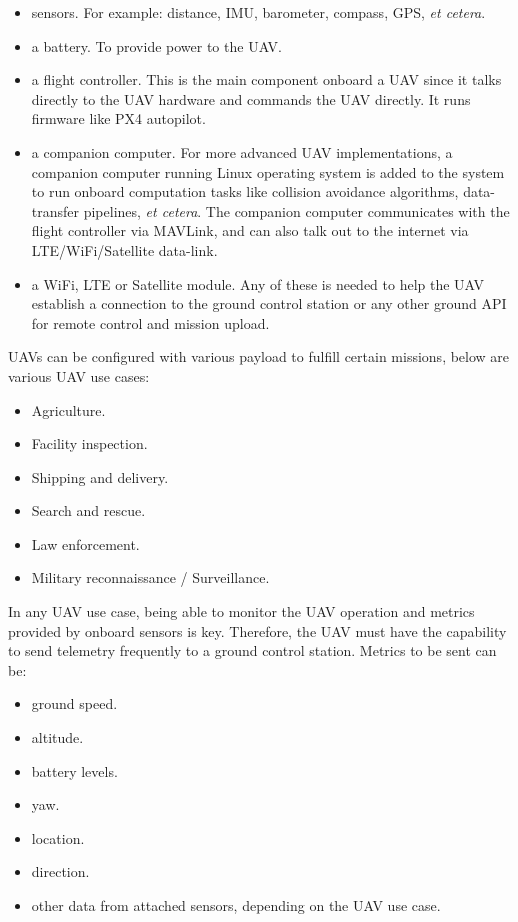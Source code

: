 \begin{itemize}
    \item sensors.  For example: distance, IMU, barometer, compass, GPS, \textit{et cetera}.
    \item a battery. To provide power to the UAV.
    \item a flight controller. This is the main component onboard a UAV since it talks directly to the UAV hardware and commands the UAV directly. It runs firmware like PX4 autopilot\cite{px4documentation}.
    \item a companion computer. For more advanced UAV implementations, a companion computer running Linux operating system is added to the system to run onboard computation tasks like collision avoidance algorithms, data-transfer pipelines, \textit{et cetera}. The companion computer communicates with the flight controller via MAVLink, and can also talk out to the internet via LTE/WiFi/Satellite data-link.
    \item a WiFi, LTE or Satellite module. Any of these is needed to help the UAV establish a connection to the ground control station or any other ground API for remote control and mission upload.
\end{itemize}

UAVs can be configured with various payload to fulfill certain missions, below are various UAV use cases:
\begin{itemize}
    \item Agriculture\cite{djienterprisedonesinagriculture}.
    \item Facility inspection\cite{dronesinfacilityinspection}.
    \item Shipping and delivery\cite{insiderintelligence2022}.
    \item Search and rescue\cite{dronesinsearchandrescue}.
    \item Law enforcement\cite{djidronesinlawenforcement}.
    \item Military reconnaissance / Surveillance\cite{dwdronesinbundeswehr}.
\end{itemize}

In any UAV use case, being able to monitor the UAV operation and metrics provided by onboard sensors is key. Therefore, the UAV must have the capability to send telemetry frequently to a ground control station. Metrics to be sent can be:
\begin{itemize}
    \item ground speed.
    \item altitude.
    \item battery levels.
    \item yaw.
    \item location.
    \item direction.
    \item other data from attached sensors, depending on the UAV use case.
\end{itemize}

